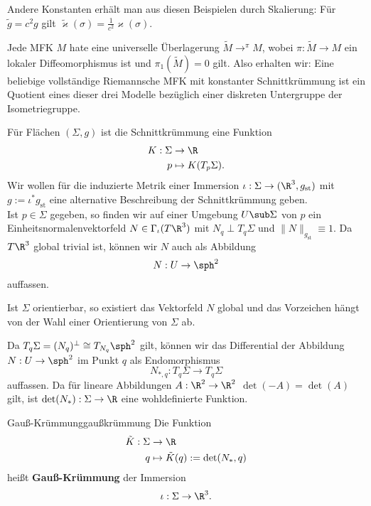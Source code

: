 \begin{bemerkung}
Andere Konstanten erhält man aus diesen Beispielen durch Skalierung: Für $\tilde{g} = c^2 g$ gilt $\tilde{\varkappa}(\sigma)=\frac{1}{c^2}\varkappa(\sigma)$.
\end{bemerkung}
\begin{bemerkung}
Jede MFK $M$ hate eine universelle Überlagerung $\tilde{M} \to^\pi M$, wobei $\pi: \tilde{M} \to M$ ein lokaler Diffeomorphismus ist und $\pi_1(\tilde{M})=0$ gilt. Also erhalten wir: Eine beliebige vollständige Riemannsche MFK mit konstanter Schnittkrümmung ist ein Quotient eines dieser drei Modelle bezüglich einer diskreten Untergruppe der Isometriegruppe.
\end{bemerkung}
Für Flächen $(\Sigma, g)$ ist die Schnittkrümmung eine Funktion
\begin{align}
K: \Sigma &\to \R\\
p &\mapsto K(T_p\Sigma).
\end{align}
Wir wollen für die induzierte Metrik einer Immersion $\iota: \Sigma \to (\R^3, g_\text{st})$ mit $g:= \iota^\ast g_\text{st}$ eine alternative Beschreibung der Schnittkrümmung geben.\\
Ist $p \in \Sigma$ gegeben, so finden wir auf einer Umgebung $U \sub \Sigma$ von $p$ ein Einheitsnormalenvektorfeld $N \in \Gamma_\iota (T\R^3)$ mit $N_q \perp T_q\Sigma$ und $\| N \|_{g_\text{st}} \equiv 1$. Da $T\R^3$ global trivial ist, können wir $N$ auch als Abbildung 
\begin{equation}
N: U \to \sph^2
\end{equation}
auffassen.
\begin{bemerkung}
Ist $\Sigma$ orientierbar, so existiert das Vektorfeld $N$ global und das Vorzeichen hängt von der Wahl einer Orientierung von $\Sigma$ ab.
\end{bemerkung}
Da $T_q\Sigma = (N_q)^{\perp} \cong T_{N_q}\sph^2$ gilt, können wir das Differential der Abbildung $N: U \to \sph^2$ im Punkt $q$ als Endomorphismus
\begin{equation}
N_{\ast,q}: T_q\Sigma \to T_q \Sigma
\end{equation}
auffassen. Da für lineare Abbildungen $A: \R^2 \to \R^2$ $\det(-A) = \det(A)$ gilt, ist $\det(N_\ast): \Sigma \to \R$ eine wohldefinierte Funktion.
\begin{definition}{Gauß-Krümmung}{gaußkrümmung}
Die Funktion
\begin{align}
\tilde{K}: \Sigma &\to \R \\
q &\mapsto \tilde{K}(q):=\det(N_\ast, q)
\end{align}
heißt \textbf{Gauß-Krümmung} der Immersion
\begin{equation}
\iota: \Sigma \to \R^3.
\end{equation}
\end{definition}
